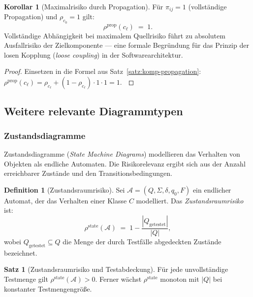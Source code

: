 ﻿\documentclass[a4paper,12pt]{article}
\theoremstyle{definition}
\newtheorem{definition}{Definition}
\newtheorem{satz}{Satz}
\newtheorem{korollar}{Korollar}
\newenvironment{beweis}{\begin{proof}}{\end{proof}}
\begin{document}
\begin{korollar}[Maximalrisiko durch Propagation]
\label{kor:komp-max}
    F\"ur $\pi_{ij} = 1$ (vollst\"andige Propagation) und $\rho_{c_0} = 1$ gilt:
    \[
        \rho^{\mathrm{prop}}(c_\ell) \;=\; 1.
    \]
    Vollst\"andige Abh\"angigkeit bei maximalem Quellrisiko f\"uhrt zu absolutem
    Ausfallrisiko der Zielkomponente --- eine formale Begr\"undung f\"ur das Prinzip
    der losen Kopplung (\emph{loose coupling}) in der Softwarearchitektur.
\end{korollar}

\begin{beweis}
    Einsetzen in die Formel aus Satz~\ref{satz:komp-propagation}:
    $\rho^{\mathrm{prop}}(c_\ell) = \rho_{c_\ell} + (1-\rho_{c_\ell}) \cdot 1 \cdot 1 = 1$.
    $\qedhere$
\end{beweis}

\subsection{Weitere relevante Diagrammtypen}

\subsubsection{Zustandsdiagramme}

Zustandsdiagramme (\emph{State Machine Diagrams}) modellieren das Verhalten von
Objekten als endliche Automaten. Die Risikorelevanz ergibt sich aus der Anzahl
erreichbarer Zust\"ande und den Transitionsbedingungen.

\begin{definition}[Zustandsraumrisiko]
\label{def:zustandsrisiko}
    Sei $\mathcal{A} = (Q, \Sigma, \delta, q_0, F)$ ein endlicher Automat, der
    das Verhalten einer Klasse $C$ modelliert. Das \emph{Zustandsraumrisiko} ist:
    \[
        \rho^{\mathrm{state}}(\mathcal{A}) \;=\; 1 - \frac{|Q_{\mathrm{getestet}}|}{|Q|},
    \]
    wobei $Q_{\mathrm{getestet}} \subseteq Q$ die Menge der durch Testf\"alle
    abgedeckten Zust\"ande bezeichnet.
\end{definition}

\begin{satz}[Zustandsraumrisiko und Testabdeckung]
\label{satz:zustand-test}
    F\"ur jede unvollst\"andige Testmenge gilt
    $\rho^{\mathrm{state}}(\mathcal{A}) > 0$.
    Ferner w\"achst $\rho^{\mathrm{state}}$ monoton mit $|Q|$ bei konstanter
    Testmengengr\"o\ss{}e.
\end{satz}
\end{document}
